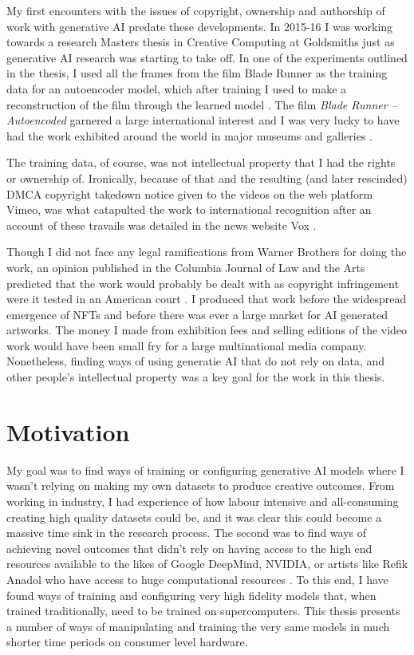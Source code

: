 My first encounters with the issues of copyright, ownership and authorship of work with generative AI predate these developments. 
In 2015-16 I was working towards a research Masters thesis in Creative Computing at Goldsmiths just as generative AI research was starting to take off. 
In one of the experiments outlined in the thesis, I used all the frames from the film Blade Runner as the training data for an autoencoder model, which after training I used to make a reconstruction of the film through the learned model \citep{broad2016autoencoding}.
The film \textit{Blade Runner -- Autoencoded} garnered a large international interest and I was very lucky to have had the work exhibited around the world in major museums and galleries \citep{broad2017autoencoding}.

The training data, of course, was not intellectual property that I had the rights or ownership of. 
Ironically, because of that and the resulting (and later rescinded) DMCA copyright takedown notice given to the videos on the web platform Vimeo, was what catapulted the work to international recognition after an account of these travails was detailed in the news website Vox \citep{romano2016bladerunner}.

Though I did not face any legal ramifications from Warner Brothers for doing the work, an opinion published in the Columbia Journal of Law and the Arts predicted that the work would probably be dealt with as copyright infringement were it tested in an American court \citep{sobel2017artificial}. 
I produced that work before the widespread emergence of NFTs and before there was ever a large market for AI generated artworks. 
The money I made from exhibition fees and selling editions of the video work would have been small fry for a large multinational media company. 
Nonetheless, finding ways of using generatie AI that do not rely on data, and other people's intellectual property was a key goal for the work in this thesis.

\section{Motivation}

My goal was to find ways of training or configuring generative AI models where I wasn’t relying on making my own datasets to produce creative outcomes. 
From working in industry, I had experience of how labour intensive and all-consuming creating high quality datasets could be, and it was clear this could become a massive time sink in the research process. 
The second was to find ways of achieving novel outcomes that didn’t rely on having access to the high end resources available to the likes of Google DeepMind, NVIDIA, or artists like Refik Anadol who have access to huge computational resources \citep{caulfield2022refik}. 
To this end, I have found ways of training and configuring very high fidelity models that, when trained traditionally, need to be trained on supercomputers. 
This thesis presents a number of ways of manipulating and training the very same models in much shorter time periods on consumer level hardware. 


